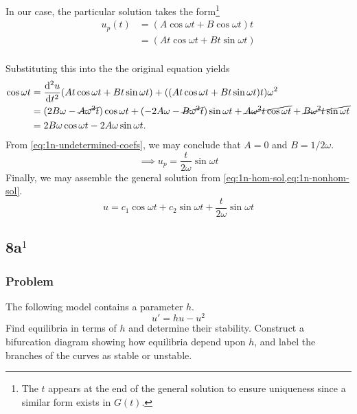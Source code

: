 \documentclass[12pt]{article}
\begin{document}
\begin{enumerate}
  In our case, the particular solution takes the form\footnote{The $t$ appears
    at the end of the general solution to ensure uniqueness since a similar form
    exists in $G(t)$.}
  \begin{equation*}
    \begin{aligned}
      u_p(t) &= (A\cos \omega t + B\cos \omega t)t \\
      &= (At\cos \omega t + Bt\sin \omega t) \\
    \end{aligned}
  \end{equation*}

  Substituting this into the the original equation yields
  \begin{equation}
    \label{eq:1n-undetermined-coefs}
    \begin{aligned}
      \cos \omega t &=
      \od[2]{u}{t}(At\cos \omega t + Bt\sin \omega t)
      + ((At\cos \omega t + Bt\sin \omega t)t)\omega^2 \\
      &= (2B\omega - \cancel{A\omega^2t})\cos\omega t
      + (-2A\omega - \cancel{B\omega^2t})\sin\omega t
      + \cancel{A\omega^2t\cos\omega t} + \cancel{B\omega^2t\sin\omega t} \\
      &= 2B\omega\cos\omega t - 2A\omega\sin\omega t.
    \end{aligned}
  \end{equation}
  From \cref{eq:1n-undetermined-coefs}, we may conclude that $A=0$ and
  $B=1/2\omega$.
  \begin{equation}
    \label{eq:1n-nonhom-sol}
    \implies u_p = \frac{t}{2\omega}\sin\omega t
  \end{equation}
  Finally, we may assemble the general solution from
  \cref{eq:1n-hom-sol,eq:1n-nonhom-sol}.
  \begin{equation*}
    \boxed{
      u = c_1\cos \omega t + c_2\sin \omega t + \frac{t}{2\omega}\sin\omega t
    }
  \end{equation*}
\end{enumerate}

\subsection{8a$^1$}
\subsubsection*{Problem}
The following model contains a parameter $h$.
\begin{equation*}
  \label{eq:8a-problem}
  u'=hu-u^2
\end{equation*}
Find equilibria in terms of $h$ and determine their stability. Construct a
bifurcation diagram showing how equilibria depend upon $h$, and label the
branches of the curves as stable or unstable.
\end{document}
